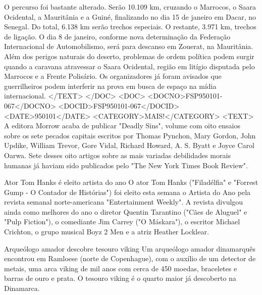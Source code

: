 O percurso foi bastante alterado. Serão 10.109 km, cruzando o Marrocos, o Saara Ocidental, a Mauritânia e a Guiné, finalizando no dia 15 de janeiro em Dacar, no Senegal.
Do total, 6.138 km serão trechos especiais. O restante, 3.971 km, trechos de ligação.
O dia 8 de janeiro, conforme nova determinação da Federação Internacional de Automobilismo, será para descanso em Zouerat, na Mauritânia.
Além dos perigos naturais do deserto, problemas de ordem política podem surgir quando a caravana atravessar o Saara Ocidental, região em litígio disputada pelo Marrocos e a Frente Polisário.
Os organizadores já foram avisados que guerrilheiros podem interferir na prova em busca de espaço na mídia internacional.
</TEXT>
</DOC>
<DOC>
<DOCNO>FSP950101-067</DOCNO>
<DOCID>FSP950101-067</DOCID>
<DATE>950101</DATE>
<CATEGORY>MAIS!</CATEGORY>
<TEXT>
A editora Morrow acaba de publicar "Deadly Sins", volume com oito ensaios sobre os sete pecados capitais escritos por Thomas Pynchon, Mary Gordon, John Updike, William Trevor, Gore Vidal, Richard Howard, A. S. Byatt e Joyce Carol Oarwa. Sete desses oito artigos sobre as mais variadas debilidades morais humanas já haviam sido publicados pelo "The New York Times Book Review".

Ator Tom Hanks é eleito artista do ano 
O ator Tom Hanks ("Filadélfia" e "Forrest Gump - O Contador de Histórias") foi eleito esta semana o Artista do Ano pela revista semanal norte-americana "Entertainment Weekly". A revista divulgou ainda como melhores do ano o diretor Quentin Tarantino ("Cães de Aluguel" e "Pulp Fiction"), o comediante Jim Carrey ("O Máskara"), o escritor Michael Crichton, o grupo musical Boyz 2 Men e a atriz Heather Locklear.

Arqueólogo amador descobre tesouro viking 
Um arqueólogo amador dinamarquês encontrou em Ramloese (norte de Copenhague), com o auxílio de um detector de metais, uma arca viking de mil anos com cerca de 450 moedas, braceletes e barras de ouro e prata. O tesouro viking é o quarto maior já descoberto na Dinamarca.

